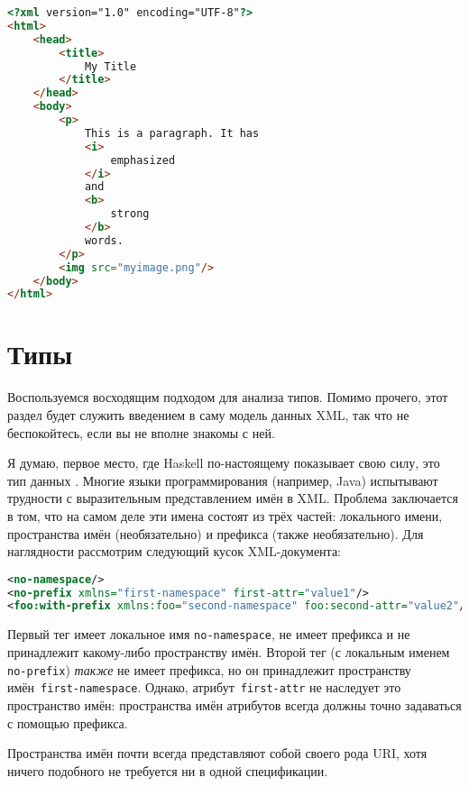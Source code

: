 
\begin{lstlisting}[language=HTML, caption={Выходные данные в формате XHTML}]
<?xml version="1.0" encoding="UTF-8"?>
<html>
    <head>
        <title>
            My Title
        </title>
    </head>
    <body>
        <p>
            This is a paragraph. It has
            <i>
                emphasized
            </i>
            and
            <b>
                strong
            </b>
            words.
        </p>
        <img src="myimage.png"/>
    </body>
</html>
\end{lstlisting}

\section{Типы} %

Воспользуемся восходящим подходом для анализа типов. Помимо прочего, этот
раздел будет служить введением в саму модель данных XML, так что не
беспокойтесь, если вы не вполне знакомы с ней.

Я думаю, первое место, где Haskell по-настоящему показывает свою силу, это тип
данных
.
Многие языки программирования (например, Java) испытывают трудности с
выразительным представлением имён в XML. Проблема заключается в том, что на
самом деле эти имена состоят из трёх частей: локального имени, пространства
имён (необязательно) и префикса (также необязательно). Для наглядности
рассмотрим следующий кусок XML-документа:
\begin{lstlisting}[language=XML]
<no-namespace/>
<no-prefix xmlns="first-namespace" first-attr="value1"/>
<foo:with-prefix xmlns:foo="second-namespace" foo:second-attr="value2"/>
\end{lstlisting}

Первый тег имеет локальное имя \lstinline!no-namespace!, не имеет префикса и не
принадлежит какому-либо пространству имён. Второй тег (с локальным именем
\lstinline!no-prefix!) \emph{также} не имеет префикса, но он принадлежит
пространству имён~\lstinline!first-namespace!. Однако,
атрибут~\lstinline!first-attr! не наследует это пространство имён: пространства
имён атрибутов всегда должны точно задаваться с помощью префикса.

\begin{remark}
    Пространства имён почти всегда представляют собой своего рода URI, хотя
    ничего подобного не требуется ни в одной спецификации.
\end{remark}

